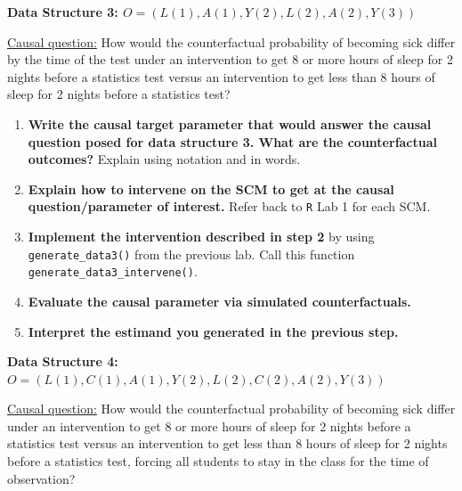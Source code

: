 \documentclass[answers]{exam}
\begin{document}
\noindent\large\textbf{Data Structure 3: $O = (L(1), A(1), Y(2), L(2), A(2), Y(3))$}

\normalsize

\noindent\underline{Causal question:} How would the counterfactual probability of becoming sick differ by the time of the test under an intervention to get 8 or more hours of sleep for 2 nights before a statistics test versus an intervention to get less than 8 hours of sleep for 2 nights before a statistics test?

\begin{enumerate}
\item \textbf{Write the causal target parameter that would answer the causal question posed for data structure 3. What are the counterfactual outcomes?} Explain using notation and in words.
\item \textbf{Explain how to intervene on the SCM to get at the causal question/parameter of interest.} Refer back to \texttt{R} Lab 1 for each SCM.
\item \textbf{Implement the intervention described in step 2} by using \texttt{generate\_data3()} from the previous lab. Call this function \texttt{generate\_data3\_intervene()}.
\item \textbf{Evaluate the causal parameter via simulated counterfactuals.}
\item \textbf{Interpret the estimand you generated in the previous step.}
\end{enumerate}




\pagebreak

\noindent\large\textbf{Data Structure 4: $O = (L(1), C(1), A(1), Y(2), L(2), C(2), A(2), Y(3))$}
\normalsize

\noindent\underline{Causal question:} How would the counterfactual probability of becoming sick differ under an intervention to get 8 or more hours of sleep for 2 nights before a statistics test versus an intervention to get less than 8 hours of sleep for 2 nights before a statistics test, forcing all students to stay in the class for the time of observation?
\end{document}
